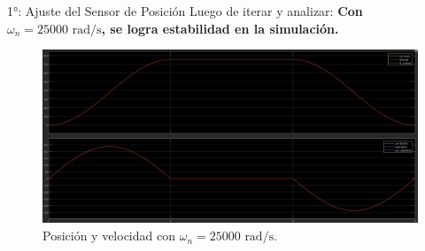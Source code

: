\documentclass[12pt]{beamer}
\begin{document}
\begin{frame}{1°: Ajuste del Sensor de Posición}
Luego de iterar y analizar:
    \textbf{Con \(\omega_n = 25000 \text{ rad/s}\), se logra estabilidad en la simulación.}
    \begin{figure}
        \centering
        \includegraphics[width=1\textwidth]{Imagenes/5_posNI_25000_pw.png}
        \caption{Posición y velocidad con \(\omega_n = 25000 \text{ rad/s}\).}
    \end{figure}
\end{frame}
\end{document}
